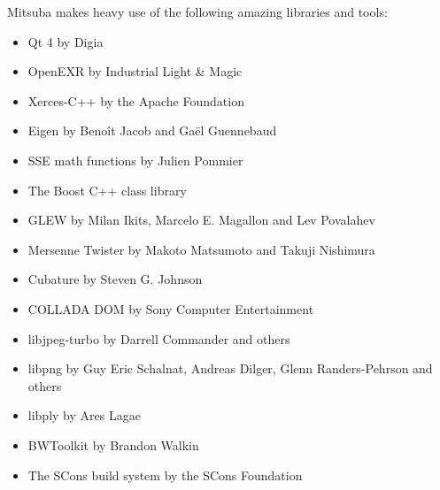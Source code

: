 Mitsuba makes heavy use of the following amazing libraries and tools:
\begin{itemize}
\item Qt 4 by Digia
\item OpenEXR by Industrial Light \& Magic
\item Xerces-C+\!+ by the Apache Foundation
\item Eigen by Beno\^it Jacob and Ga\"el Guennebaud
\item SSE math functions by Julien Pommier
\item The Boost C+\!+ class library
\item GLEW by Milan Ikits, Marcelo E. Magallon and Lev Povalahev
\item Mersenne Twister by Makoto Matsumoto and Takuji Nishimura
\item Cubature by Steven G. Johnson
\item COLLADA DOM by Sony Computer Entertainment
\item libjpeg-turbo by Darrell Commander and others
\item libpng by Guy Eric Schalnat, Andreas Dilger, Glenn Randers-Pehrson and \mbox{others}
\item libply by Ares Lagae
\item BWToolkit by Brandon Walkin
\item The SCons build system by the SCons Foundation
\end{itemize}

